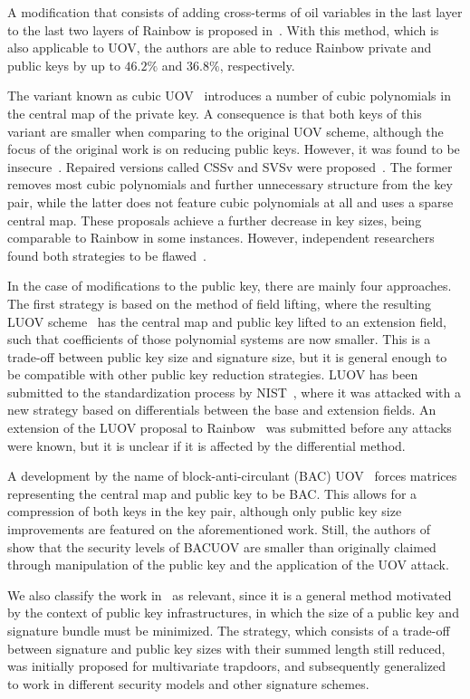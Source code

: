 \documentclass[draft, 12pt, a4paper, oneside]{memoir}
\begin{document}
A modification that consists of adding cross-terms of oil variables in the last layer to the last two layers of Rainbow is proposed in~\cite{}. With this method, which is also applicable to UOV, the authors are able to reduce Rainbow private and public keys by up to $46.2\%$ and $36.8\%$, respectively.

The variant known as cubic UOV~\cite{} introduces a number of cubic polynomials in the central map of the private key. A consequence is that both keys of this variant are smaller when comparing to the original UOV scheme, although the focus of the original work is on reducing public keys. However, it was found to be insecure~\cite{}. Repaired versions called CSSv and SVSv were proposed~\cite{}. The former removes most cubic polynomials and further unnecessary structure from the key pair, while the latter does not feature cubic polynomials at all and uses a sparse central map. These proposals achieve a further decrease in key sizes, being comparable to Rainbow in some instances. However, independent researchers found both strategies to be flawed~\cite{}.

In the case of modifications to the public key, there are mainly four approaches. The first strategy is based on the method of field lifting, where the resulting LUOV scheme~\cite{} has the central map and public key lifted to an extension field, such that coefficients of those polynomial systems are now smaller. This is a trade-off between public key size and signature size, but it is general enough to be compatible with other public key reduction strategies. LUOV has been submitted to the standardization process by NIST~\cite{}, where it was attacked with a new strategy based on differentials between the base and extension fields. An extension of the LUOV proposal to Rainbow~\cite{} was submitted before any attacks were known, but it is unclear if it is affected by the differential method.

A development by the name of block-anti-circulant (BAC) UOV~\cite{} forces matrices representing the central map and public key to be BAC. This allows for a compression of both keys in the key pair, although only public key size improvements are featured on the aforementioned work. Still, the authors of~\cite{} show that the security levels of BACUOV are smaller than originally claimed through manipulation of the public key and the application of the UOV attack.

We also classify the work in~\cite{} as relevant, since it is a general method motivated by the context of public key infrastructures, in which the size of a public key and signature bundle must be minimized. The strategy, which consists of a trade-off between signature and public key sizes with their summed length still reduced, was initially proposed for multivariate trapdoors, and subsequently generalized~\cite{} to work in different security models and other signature schemes.
\end{document}
